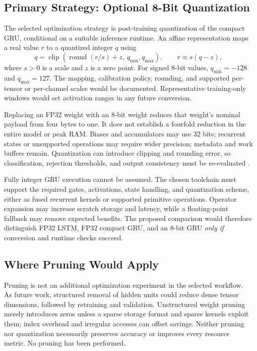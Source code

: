 \documentclass[conference]{IEEEtran}
\begin{document}
\subsection{Primary Strategy: Optional 8-Bit Quantization}
The selected optimization strategy is post-training quantization of the compact GRU, conditional on a suitable inference runtime. An affine representation maps a real value $r$ to a quantized integer $q$ using
\begin{equation}
q=\operatorname{clip}\!\left(\operatorname{round}(r/s)+z,\ q_{\min},q_{\max}\right),
\qquad r\approx s(q-z),
\end{equation}
where $s>0$ is a scale and $z$ is a zero point. For signed 8-bit values, $q_{\min}=-128$ and $q_{\max}=127$. The mapping, calibration policy, rounding, and supported per-tensor or per-channel scales would be documented. Representative training-only windows would set activation ranges in any future conversion.

Replacing an FP32 weight with an 8-bit weight reduces that weight's nominal payload from four bytes to one. It does not establish a fourfold reduction in the entire model or peak RAM. Biases and accumulators may use 32 bits; recurrent states or unsupported operations may require wider precision; metadata and work buffers remain. Quantization can introduce clipping and rounding error, so classification, rejection thresholds, and output consistency must be re-evaluated \cite{jacob2018}.

Fully integer GRU execution cannot be assumed. The chosen toolchain must support the required gates, activations, state handling, and quantization scheme, either as fused recurrent kernels or supported primitive operations. Operator expansion may increase scratch storage and latency, while a floating-point fallback may remove expected benefits. The proposed comparison would therefore distinguish FP32 LSTM, FP32 compact GRU, and an 8-bit GRU \emph{only if} conversion and runtime checks succeed.

\subsection{Where Pruning Would Apply}
Pruning is not an additional optimization experiment in the selected workflow. As future work, structured removal of hidden units could reduce dense tensor dimensions, followed by retraining and validation. Unstructured weight pruning merely introduces zeros unless a sparse storage format and sparse kernels exploit them; index overhead and irregular accesses can offset savings. Neither pruning nor quantization necessarily preserves accuracy or improves every resource metric. No pruning has been performed.
\end{document}
